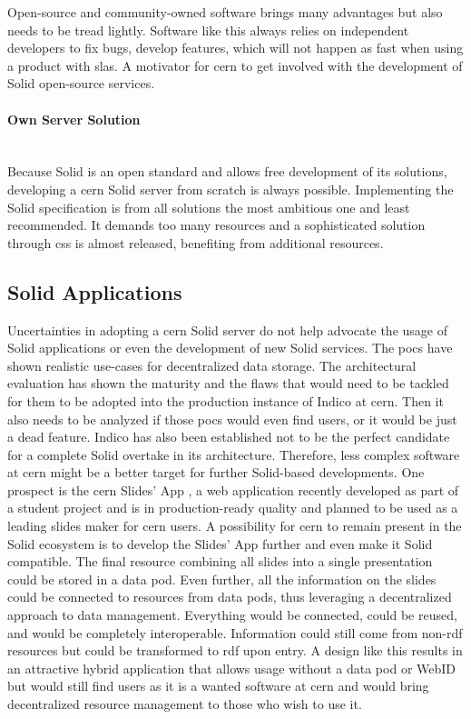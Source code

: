 Open-source and community-owned software brings many advantages but also needs to be tread lightly. Software like this always relies on independent developers to fix bugs, develop features, which will not happen as fast when using a product with \glspl{sla}. A motivator for \gls{cern} to get involved with the development of Solid open-source services.
\vspace{0.5cm}
\paragraph{Own Server Solution}\mbox{}\\

Because Solid is an open standard and allows free development of its solutions, developing a \gls{cern} Solid server from scratch is always possible. Implementing the Solid specification is from all solutions the most ambitious one and least recommended. It demands too many resources and a sophisticated solution through \gls{css} is almost released, benefiting from additional resources.

\subsection{Solid Applications}

Uncertainties in adopting a \gls{cern} Solid server do not help advocate the usage of Solid applications or even the development of new Solid services. The \glspl{poc} have shown realistic use-cases for decentralized data storage. The architectural evaluation has shown the maturity and the flaws that would need to be tackled for them to be adopted into the production instance of Indico at \gls{cern}. Then it also needs to be analyzed if those \glspl{poc} would even find users, or it would be just a dead feature. Indico has also been established not to be the perfect candidate for a complete Solid overtake in its architecture. Therefore, less complex software at \gls{cern} might be a better target for further Solid-based developments. One prospect is the \gls{cern} Slides' App \cite{cern-slides}, a web application recently developed as part of a student project and is in production-ready quality and planned to be used as a leading slides maker for \gls{cern} users. A possibility for \gls{cern} to remain present in the Solid ecosystem is to develop the Slides' App further and even make it Solid compatible. The final resource combining all slides into a single presentation could be stored in a data pod. Even further, all the information on the slides could be connected to resources from data pods, thus leveraging a decentralized approach to data management. Everything would be connected, could be reused, and would be completely interoperable. Information could still come from non-\gls{rdf} resources but could be transformed to \gls{rdf} upon entry. A design like this results in an attractive hybrid application that allows usage without a data pod or WebID but would still find users as it is a wanted software at \gls{cern} and would bring decentralized resource management to those who wish to use it.

